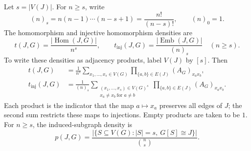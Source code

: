 Let $s=|V(J)|$.
For $n\geq s$, write
\[
(n)_s=n(n-1)\cdots(n-s+1)=\frac{n!}{(n-s)!},
\qquad (n)_0=1.
\]
The homomorphism and injective homomorphism densities are
\begin{equation}\label{eq:graph-homomorphism-densities}
t(J,G)=\frac{|\operatorname{Hom}(J,G)|}{n^s},
\qquad
t_{\mathrm{inj}}(J,G)=\frac{|\operatorname{Emb}(J,G)|}{(n)_s}
\quad(n\geq s).
\end{equation}
To write these densities as adjacency products, label $V(J)$ by $[s]$.
Then
\begin{align}
t(J,G)
&=\frac1{n^s}
\sum_{x_1,\ldots,x_s\in V(G)}
\prod_{\{a,b\}\in E(J)}(A_G)_{x_ax_b},
\label{eq:graph-homomorphism-product}\\
t_{\mathrm{inj}}(J,G)
&=\frac1{(n)_s}
\sum_{\substack{(x_1,\ldots,x_s)\in V(G)^s\\
x_a\ne x_b\ \text{for }a\ne b}}
\prod_{\{a,b\}\in E(J)}(A_G)_{x_ax_b}.
\label{eq:graph-injective-product}
\end{align}
Each product is the indicator that the map $a\mapsto x_a$ preserves
all edges of $J$; the second sum restricts these maps to injections.
Empty products are taken to be $1$.
For $n\geq s$, the induced-subgraph density is
\begin{equation}\label{eq:graph-induced-density}
p(J,G)=
\frac{\big|\{S\subseteq V(G):|S|=s,\ G[S]\cong J\}\big|}
{\binom ns}.
\end{equation}

